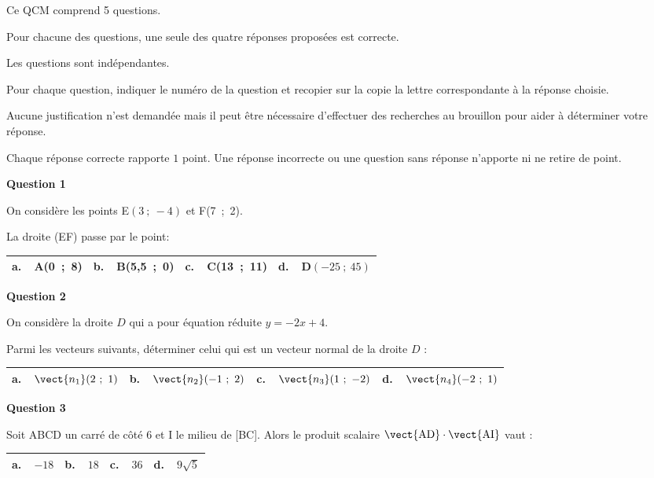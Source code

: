 \medskip

Ce QCM comprend 5 questions.

Pour chacune des questions, une seule des quatre réponses proposées est correcte.

Les questions sont indépendantes.

Pour chaque question, indiquer le numéro de la question et recopier sur la copie la lettre correspondante à la réponse choisie.

Aucune justification n'est demandée mais il peut être nécessaire d'effectuer des recherches au brouillon pour aider à déterminer votre réponse.

Chaque réponse correcte rapporte $1$ point. Une réponse incorrecte ou une question sans réponse n'apporte ni ne retire de point.

\medskip

\textbf{Question 1} 

On considère les points E$(3~;~-4)$ et F(7~;~2).

La droite (EF) passe par le point:

\begin{center}
\begin{tabularx}{\linewidth}{|*{4}{X|}}\hline
\textbf{a.~~}A(0~;~8)&\textbf{b.~~}B(5,5~;~0)&\textbf{c.~~}C(13~;~11)&\textbf{d.~~}D$(-25~;~45)$\\ \hline
\end{tabularx}
\end{center}


\textbf{Question 2}

On considère la droite $D$ qui a pour équation réduite $y = - 2x + 4$.

Parmi les vecteurs suivants, déterminer celui qui est un vecteur normal de la droite $D$ :

\begin{center}
\begin{tabularx}{\linewidth}{|*{4}{X|}}\hline
\textbf{a.~~}$\vect{n_1}(2~;~1)$\rule{0pt}{12pt}&\textbf{b.~~}$\vect{n_2}(-1~;~2)$&\textbf{c.~~}$\vect{n_3}(1~;~-2)$&\textbf{d.~~}$\vect{n_4}(-2~;~1)$\\ \hline
\end{tabularx}
\end{center}

\textbf{Question 3}

Soit ABCD un carré de côté 6 et I le milieu de [BC]. Alors le produit scalaire $\vect{\text{AD}} \cdot \vect{\text{AI}}$ vaut :

\begin{center}
\begin{tabularx}{\linewidth}{|*{4}{X|}}\hline
\textbf{a.~~}$- 18$&\textbf{b.~~}$18$&\textbf{c.~~}$36$&\textbf{d.~~}$9\sqrt{5}$\\ \hline
\end{tabularx}
\end{center}

